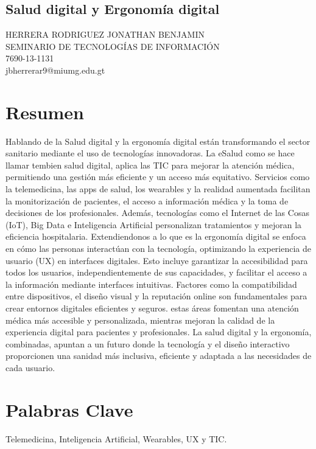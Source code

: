 \documentclass[12pt]{article}
\begin{document}
\begin{center}
\section*{Salud digital y Ergonomía digital}
HERRERA RODRIGUEZ JONATHAN BENJAMIN
\\SEMINARIO DE TECNOLOGÍAS DE INFORMACIÓN
\\7690-13-1131
\\jbherrerar9@miumg.edu.gt
\end{center}
\section{Resumen}

Hablando de la Salud digital y la ergonomía digital están transformando el sector sanitario mediante el uso de tecnologías innovadoras. La eSalud como se hace llamar tembien salud digital, aplica las TIC para mejorar la atención médica, permitiendo una gestión más eficiente y un acceso más equitativo. Servicios como la telemedicina, las apps de salud, los wearables y la realidad aumentada facilitan la monitorización de pacientes, el acceso a información médica y la toma de decisiones de los profesionales. Además, tecnologías como el Internet de las Cosas (IoT), Big Data e Inteligencia Artificial personalizan tratamientos y mejoran la eficiencia hospitalaria.
Extendiendonos a lo que es la ergonomía digital se enfoca en cómo las personas interactúan con la tecnología, optimizando la experiencia de usuario (UX) en interfaces digitales. Esto incluye garantizar la accesibilidad para todos los usuarios, independientemente de sus capacidades, y facilitar el acceso a la información mediante interfaces intuitivas. Factores como la compatibilidad entre dispositivos, el diseño visual y la reputación online son fundamentales para crear entornos digitales eficientes y seguros.
estas áreas fomentan una atención médica más accesible y personalizada, mientras mejoran la calidad de la experiencia digital para pacientes y profesionales. La salud digital y la ergonomía, combinadas, apuntan a un futuro donde la tecnología y el diseño interactivo proporcionen una sanidad más inclusiva, eficiente y adaptada a las necesidades de cada usuario.

\section{Palabras Clave}
Telemedicina, Inteligencia Artificial, Wearables, UX y TIC.
\end{document}
